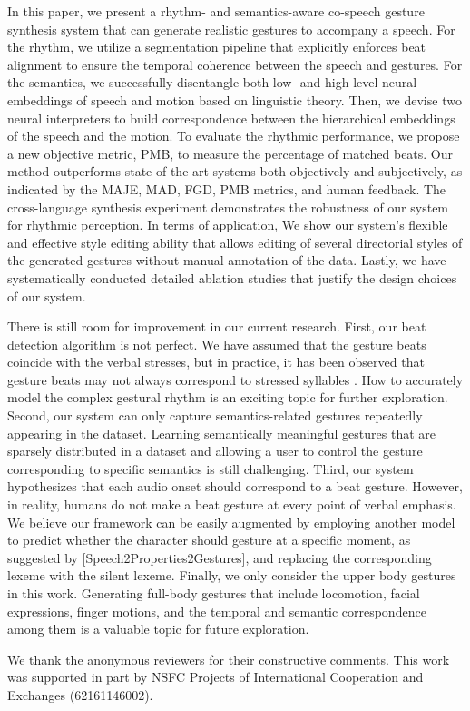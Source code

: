 \documentclass[acmtog,authorversion]{acmart}
\begin{document}
In this paper, we present a rhythm- and semantics-aware co-speech gesture synthesis system that can generate realistic gestures to accompany a speech.  For the rhythm, we utilize a segmentation pipeline that explicitly enforces beat alignment to ensure the temporal coherence between the speech and gestures. For the semantics, we successfully disentangle both low- and high-level neural embeddings of speech and motion based on linguistic theory. Then, we devise two neural interpreters to build correspondence between the hierarchical embeddings of the speech and the motion. To evaluate the rhythmic performance, we propose a new objective metric, PMB, to measure the percentage of matched beats. Our method outperforms state-of-the-art systems both objectively and subjectively, as indicated by the MAJE, MAD, FGD, PMB metrics, and human feedback. The cross-language synthesis experiment demonstrates the robustness of our system for rhythmic perception. In terms of application, We show our system's flexible and effective style editing ability that allows editing of several directorial styles of the generated gestures without manual annotation of the data. Lastly, we have systematically conducted detailed ablation studies that justify the design choices of our system.

There is still room for improvement in our current research. 
First, our beat detection algorithm is not perfect. We have assumed that the gesture beats coincide with the verbal stresses, but in practice, it has been observed that gesture beats may not always correspond to stressed syllables \cite{mcclave1994gestural}. 
How to accurately model the complex gestural rhythm is an exciting topic for further exploration.
Second, our system can only capture semantics-related gestures repeatedly appearing in the dataset. Learning semantically meaningful gestures that are sparsely distributed in a dataset and allowing a user to control the gesture corresponding to specific semantics is still challenging.
Third, our system hypothesizes that each audio onset should correspond to a beat gesture. However, in reality, humans do not make a beat gesture at every point of verbal emphasis. We believe our framework can be easily augmented by employing another model to predict whether the character should gesture at a specific moment, as suggested by [Speech2Properties2Gestures], and replacing the corresponding lexeme with the silent lexeme.
Finally, we only consider the upper body gestures in this work. Generating full-body gestures that include locomotion, facial expressions, finger motions, and the temporal and semantic correspondence among them is a valuable topic for future exploration. 
\begin{acks}
    We thank the anonymous reviewers for their constructive comments.
    This work was supported in part by NSFC Projects of International Cooperation and Exchanges (62161146002).
\end{acks}
     


\end{document}
